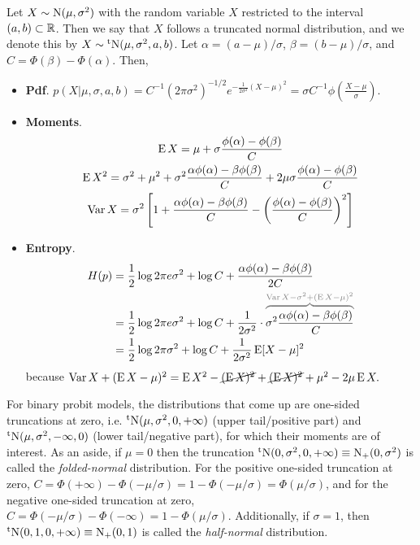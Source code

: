 Let $X \sim \operatorname{N}(\mu,\sigma^2)$ with the random variable $X$ restricted to the interval $(a,b) \subset \mathbb{R}$.
Then we say that $X$ follows a truncated normal distribution, and we denote this by $X\sim\operatorname{{}^tN}(\mu,\sigma^2,a,b)$.
Let $\alpha = (a-\mu)/\sigma$, $\beta = (b-\mu)/\sigma$, and $C = \Phi(\beta) - \Phi(\alpha)$.
Then,
\begin{itemize}
  \item \textbf{Pdf}. $p(X|\mu,\sigma,a,b) = C^{-1} (2\pi\sigma^2)^{-1/2}e^{-\frac{1}{2\sigma^2} (X-\mu)^2} = \sigma C^{-1} \phi(\frac{X-\mu}{\sigma})$.
  \item \textbf{Moments}. 
  \vspace{-1.2em}
  \begin{gather*}
    \operatorname{E} X = \mu + \sigma \frac{\phi(\alpha) - \phi(\beta)}{C} \\
    \operatorname{E} X^2 = \sigma^2 + \mu^2 + \sigma^2  \frac{\alpha\phi(\alpha) - \beta\phi(\beta)}{C}   + 2\mu\sigma \frac{\phi(\alpha) - \phi(\beta)}{C} \\
    \operatorname{Var} X = \sigma^2 \left[ 1 +  \frac{\alpha\phi(\alpha) - \beta\phi(\beta)}{C} - \left(\frac{\phi(\alpha) - \phi(\beta)}{C}\right)^2 \right]
  \end{gather*}
  \item \textbf{Entropy}.
  \begin{align*}
    H(p) 
    &= \half\log 2\pi e\sigma^2 + \log C + \frac{\alpha\phi(\alpha) - \beta\phi(\beta)}{2C} \\
    &= \half\log 2\pi e\sigma^2 + \log C + \frac{1}{2\sigma^2}\cdot \myoverbrace{\sigma^2\frac{\alpha\phi(\alpha) - \beta\phi(\beta)}{C}}{\Var X -\sigma^2 + (\E X - \mu)^2} \\
    &= \half\log 2\pi \sigma^2 + \log C + \frac{1}{2\sigma^2}\E [X - \mu]^2 
  \end{align*}
  because $\operatorname{Var} X + (\operatorname{E} X - \mu)^2 = \operatorname{E} X^2 - \cancel{(\operatorname{E} X)^2} + \cancel{(\operatorname{E} X)^2} + \mu^2 - 2\mu\operatorname{E} X.$
\end{itemize}

For binary probit models, the distributions that come up are one-sided truncations at zero, i.e. $\operatorname{{}^tN}(\mu,\sigma^2,0,+\infty)$ (upper tail/positive part) and $\operatorname{{}^tN}(\mu,\sigma^2,-\infty,0)$ (lower tail/negative part), for which their moments are of interest.
As an aside, if $\mu = 0$ then the truncation $\operatorname{{}^tN}(0,\sigma^2,0,+\infty) \equiv \operatorname{N}_+(0,\sigma^2)$ is called the \emph{folded-normal} distribution.
For the positive one-sided truncation at zero, $C = \Phi(+\infty) - \Phi(-\mu/\sigma) = 1 - \Phi(-\mu/\sigma) = \Phi(\mu/\sigma)$, and for the negative one-sided truncation at zero, $C = \Phi(-\mu/\sigma) - \Phi(-\infty) = 1 - \Phi(\mu/\sigma)$.
Additionally, if $\sigma=1$, then $\operatorname{{}^tN}(0,1,0,+\infty) \equiv \operatorname{N}_+(0,1)$ is called the \emph{half-normal} distribution.

